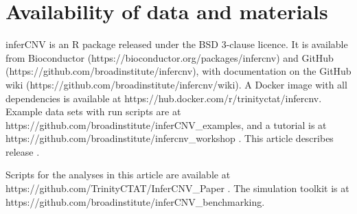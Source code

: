 \section*{Availability of data and materials}\label{sec:availability}

inferCNV is an R package released under the BSD 3-clause licence. It is available from Bioconductor (https://bioconductor.org/packages/infercnv) \citep{infercnvBioc} and GitHub (https://github.com/broadinstitute/infercnv), with documentation on the GitHub wiki (https://github.com/broadinstitute/infercnv/wiki). A Docker image with all dependencies is available at https://hub.docker.com/r/trinityctat/infercnv. Example data sets with run scripts are at https://github.com/broadinstitute/inferCNV\_examples, and a tutorial is at https://github.com/broadinstitute/infercnv\_workshop . This article describes release .

Scripts for the analyses in this article are available at https://github.com/TrinityCTAT/InferCNV\_Paper . The simulation toolkit is at https://github.com/broadinstitute/inferCNV\_benchmarking.

